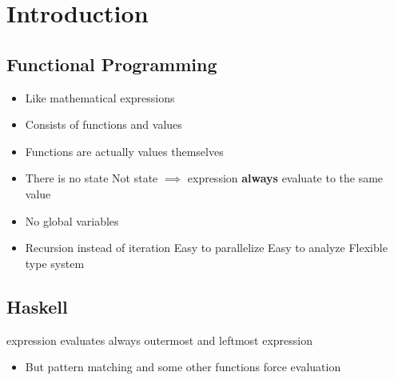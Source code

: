 
\section{Introduction}
\subsection{Functional Programming}
\begin{itemize}
    \item Like mathematical expressions
    \item Consists of functions and values
    \item Functions are actually values themselves
    \item There is no state
     Not state $\implies$ expression \textbf{always} evaluate to the same value
    \item No global variables
    \item Recursion instead of iteration
    \ipro Easy to parallelize
    \ipro Easy to analyze
    \ipro Flexible type system
\end{itemize}

\subsection{Haskell}
\begin{itemize}
     expression evaluates always outermost and leftmost expression
        \begin{itemize}
            \item But pattern matching and some other functions force evaluation
        \end{itemize}
\end{itemize}

